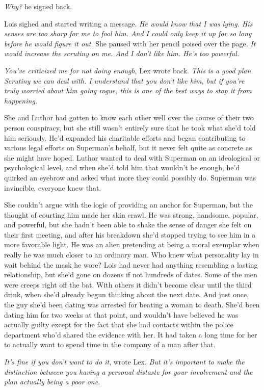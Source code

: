 \documentclass[ebook,12pt]{memoir}
\begin{document}
\emph{Why?} he signed back.

Lois sighed and started writing a message. \emph{He would know that I
was lying. His senses are too sharp for me to fool him. And I could only
keep it up for so long before he would figure it out.} She paused with
her pencil poised over the page. \emph{It would increase the scrutiny on
me. And I don't like him. He's too powerful.}

\emph{You've criticized me for not doing enough}, Lex wrote back.
\emph{This is a good plan. Scrutiny we can deal with. I understand that
you don't like him, but if you're truly worried about him going rogue,
this is one of the best ways to stop it from happening.}

She and Luthor had gotten to know each other well over the course of
their two person conspiracy, but she still wasn't entirely sure that he
took what she'd told him seriously. He'd expanded his charitable efforts
and began contributing to various legal efforts on Superman's behalf,
but it never felt quite as concrete as she might have hoped. Luthor
wanted to deal with Superman on an ideological or psychological level,
and when she'd told him that wouldn't be enough, he'd quirked an eyebrow
and asked what more they could possibly do. Superman was invincible,
everyone knew that.

She couldn't argue with the logic of providing an anchor for Superman,
but the thought of courting him made her skin crawl. He was strong,
handsome, popular, and powerful, but she hadn't been able to shake the
sense of danger she felt on their first meeting, and after his breakdown
she'd stopped trying to see him in a more favorable light. He was an
alien pretending at being a moral exemplar when really he was much
closer to an ordinary man. Who knew what personality lay in wait behind
the mask he wore? Lois had never had anything resembling a lasting
relationship, but she'd gone on dozens if not hundreds of dates. Some of
the men were creeps right off the bat. With others it didn't become
clear until the third drink, when she'd already begun thinking about the
next date. And just once, the guy she'd been dating was arrested for
beating a woman to death. She'd been dating him for two weeks at that
point, and wouldn't have believed he was actually guilty except for the
fact that she had contacts within the police department who'd shared the
evidence with her. It had taken a long time for her to actually want to
spend time in the company of a man after that.

\emph{It's fine if you don't want to do it}, wrote Lex. \emph{But it's
important to make the distinction between you having a personal distaste
for your involvement and the plan actually being a poor one.}
\end{document}
